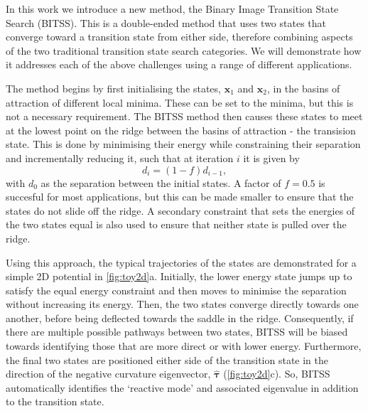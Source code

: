 \documentclass[aps,prl,twocolumn,groupedaddress]{revtex4}
\begin{document}
\topic In this work we introduce a new method, the Binary Image Transition State Search (BITSS).
This is a double-ended method that uses two states that converge toward a transition state from either side, therefore combining aspects of the two traditional transition state search categories.
We will demonstrate how it addresses each of the above challenges using a range of different applications.


\topic The method begins by first initialising the states, $\bm{x}_1$ and $\bm{x}_2$, in the basins of attraction of different local minima.
These can be set to the minima, but this is not a necessary requirement.
The BITSS method then causes these states to meet at the lowest point on the ridge between the basins of attraction - the transision state.
This is done by minimising their energy while constraining their separation and incrementally reducing it, such that at iteration $i$ it is given by
\begin{equation}\label{eq:diteration}
  d_i = (1 - f) d_{i-1},
\end{equation}
with $d_0$ as the separation between the initial states.
A factor of $f = 0.5$ is succesful for most applications, but this can be made smaller to ensure that the states do not slide off the ridge.
A secondary constraint that sets the energies of the two states equal is also used to ensure that neither state is pulled over the ridge.

\topic Using this approach, the typical trajectories of the states are demonstrated for a simple 2D potential in \cref{fig:toy2d}a.
Initially, the lower energy state jumps up to satisfy the equal energy constraint and then moves to minimise the separation without increasing its energy.
Then, the two states converge directly towards one another, before being deflected towards the saddle in the ridge.
Consequently, if there are multiple possible pathways between two states, BITSS will be biased towards identifying those that are more direct or with lower energy.
Furthermore, the final two states are positioned either side of the transition state in the direction of the negative curvature eigenvector, $\bm{\hat{\tau}}$ (\cref{fig:toy2d}c).
So, BITSS automatically identifies the `reactive mode' and associated eigenvalue in addition to the transition state.
\end{document}
